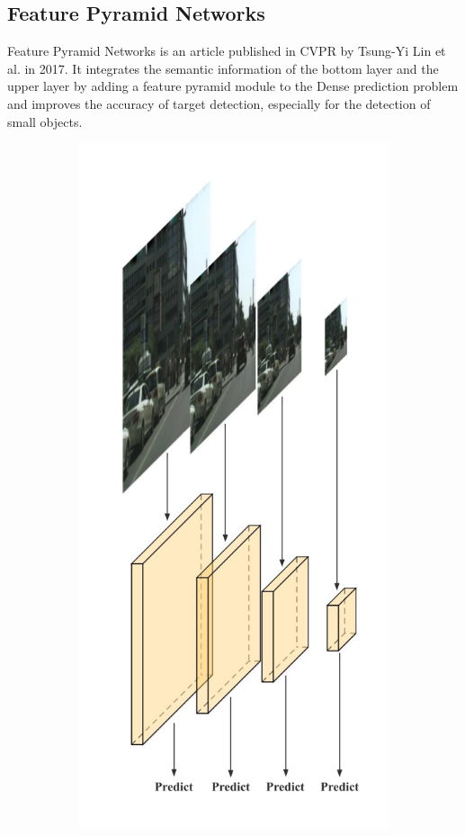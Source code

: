\subsection{Feature Pyramid Networks}
Feature Pyramid Networks \cite{lin2017feature} is an article published in CVPR by Tsung-Yi Lin et al. in 2017. It integrates the semantic information of the bottom layer and the upper layer by adding a feature pyramid module to the Dense prediction problem and improves the accuracy of target detection, especially for the detection of small objects.

\begin{figure}[htbp]
    \centering
    \begin{subfigure}[t]{0.3\linewidth}
        \includegraphics[width=1\textwidth]{figures/fcnarch1.png}

\end{subfigure}
\end{figure}
